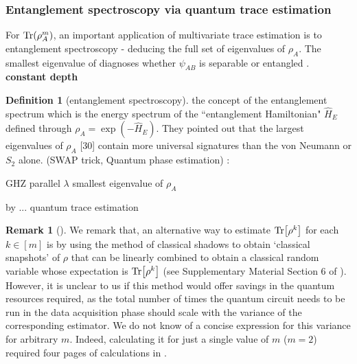 \documentclass[
10pt,
aps,
pra,
linenumbers,
floatfix,
]{revtex4-2}
\theoremstyle{plain}
\theoremstyle{definition}
\newtheorem{definition}{Definition}
\newtheorem{remark}{Remark}
\newcommand{\hamiltonian}{\hat{H}}
\newcommand{\dm}{\rho}
\begin{document}
\subsubsection{Entanglement spectroscopy via quantum trace estimation}
For $\Tr(\dm_A^m)$, an important application of multivariate trace estimation \cite{quekMultivariateTraceEstimation2022} is to entanglement spectroscopy \cite{johriEntanglementSpectroscopyQuantum2017} - deducing the full set of eigenvalues of $\dm_A$. The smallest eigenvalue of diagnoses whether $\psi_{AB}$ is separable or entangled \cite{horodeckiDirectDetectionQuantum2002}. \textbf{constant depth}
\begin{definition}[entanglement spectroscopy]\label{def:entanglement_spectroscopy}
	the concept of the entanglement spectrum which is the energy spectrum of the ``entanglement Hamiltonian" $\hamiltonian_E$ defined through $\dm_A = \exp(−\hamiltonian_E )$. They pointed out that the largest eigenvalues of $\dm_A$ [30] contain more universal signatures than the von Neumann  or $S_2$ alone. (SWAP trick, Quantum phase estimation)
	\cite{johriEntanglementSpectroscopyQuantum2017}:
\end{definition}


\begin{algorithm}[H]
    \DontPrintSemicolon
    \Input{(copies of) density matrix (graph state?) $\dm$,...}
    \BlankLine
     {
        GHZ  
        parallel  
    {\Return $\lambda$ }
    }
    \Return smallest eigenvalue of $\dm_A$
    \caption{ by ... quantum trace estimation}
    \label{alg:entanglement_spectroscopy}
\end{algorithm}
\begin{remark}[\cite{quekMultivariateTraceEstimation2022}]
	We remark that, an alternative way to estimate $\Tr[ \dm^k ]$ for each $k \in [m]$ is by using the method of classical shadows to obtain `classical snapshots' of $\dm$ that can be linearly combined to obtain a classical random variable whose expectation is $\Tr[ \dm^k ]$ (see Supplementary Material Section 6 of \cite{huangPredictingManyProperties2020}). 
	However, it is unclear to us if this method would offer savings in the quantum resources required, as the total number of times the quantum circuit needs to be run in the data acquisition phase should scale with the variance of the corresponding estimator. We do not know of a concise expression for this variance for arbitrary $m$. Indeed, calculating it for just a single value of $m$ ($m = 2$) required four pages of calculations in \cite{huangPredictingManyProperties2020}.
\end{remark}
\end{document}
